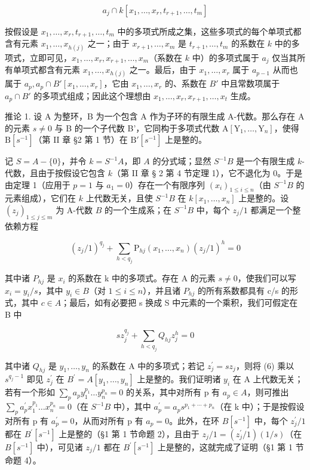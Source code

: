 \[
a _ {j} \cap k [ x _ {1}, \dots , x _ {r}, t _ {r + 1}, \dots , t _ {m} ]
\]

按假设是 \(x_1, \ldots, x_r, t_{r+1}, \ldots, t_m\) 中的多项式所成之集，这些多项式的每个单项式都含有元素 \(x_1, \ldots, x_{h(j)}\) 之一；由于 \(x_{r+1}, \ldots, x_m\) 是 \(t_{r+1}, \ldots, t_m\) 的系数在 \(k\) 中的多项式，立即可见，\(x_1, \ldots, x_r, x_{r+1}, \ldots, x_m\)（系数在 \(k\) 中）的多项式属于 \(a_j\) 仅当其所有单项式都含有元素 \(x_1, \ldots, x_{h(j)}\) 之一。最后，由于 \(x_1, \ldots, x_r\) 属于 \(a_{p-1}\) 从而也属于 \(a_p, a_p \cap B'[x_1, \ldots, x_r]\)，它由 \(x_1, \ldots, x_r\) 的、系数在 \(B'\) 中且常数项属于 \(a_p \cap B'\) 的多项式组成；因此这个理想由 \(x_1, \ldots, x_r, x_{r+1}, \ldots, x_t\) 生成。

推论 1. 设 A 为整环，B 为一个包含 A 作为子环的有限生成 A-代数。那么存在 A 的元素 \(s \neq 0\) 与 B 的一个子代数 B'，它同构于多项式代数 \(\mathrm{A}[\mathrm{Y}_{1}, \ldots, \mathrm{Y}_{n}]\)，使得 \(\mathrm{B}[s^{-1}]\)（第 II 章 §2 第 1 节）在 \(\mathrm{B}'[s^{-1}]\) 上是整的。

记 \(S = A - \{0\}\)，并令 \(k = S^{-1}A\)，即 \(A\) 的分式域；显然 \(S^{-1}B\) 是一个有限生成 \(k\)-代数，且由于按假设它包含 \(k\)（第 II 章 § 2 第 4 节定理 1），它不退化为 0。于是由定理 1（应用于 \(p = 1\) 与 \(a_1 = 0\)）存在一个有限序列 \((x_i)_{1 \leqslant i \leqslant n}\)（由 \(S^{-1}B\) 的元素组成），它们在 \(k\) 上代数无关，且使 \(S^{-1}B\) 在 \(k[x_1, \ldots, x_n]\) 上是整的。设 \((z_j)_{1 \leqslant j \leqslant m}\) 为 A-代数 \(B\) 的一个生成系；在 \(S^{-1}B\) 中，每个 \(z_j/1\) 都满足一个整依赖方程

\[
(z _ {j} / 1) ^ {q _ {j}} + \sum_ {h <   q _ {j}} \mathrm{P} _ {h j} (x _ {1}, \dots , x _ {n}) (z _ {j} / 1) ^ {h} = 0\tag{5}
\]

其中诸 \(P_{hj}\) 是 \(x_{i}\) 的系数在 k 中的多项式。存在 A 的元素 \(s \neq 0\)，使我们可以写 \(x_{i} = y_{i}/s\)，其中 \(y_{i} \in B\)（对 \(1 \leqslant i \leqslant n\)），并且诸 \(P_{hj}\) 的所有系数都具有 c/s 的形式，其中 \(c \in A\)；最后，如有必要把 s 换成 S 中元素的一个乘积，我们可假定在 B 中

\[
s z _ {j} ^ {q _ {j}} + \sum_ {h <   q _ {j}} Q _ {h j} z _ {j} ^ {h} = 0\tag{6}
\]

其中诸 \(Q_{hj}\) 是 \(y_{1},\ldots,y_{n}\) 的系数在 A 中的多项式；若记 \(z_{j}^{\prime}=sz_{j}\)，则将 (6) 乘以 \(s^{q_{j}-1}\) 即见 \(z_{j}^{\prime}\) 在 \(B^{\prime}=A[y_{1},\ldots,y_{n}]\) 上是整的。我们证明诸 \(y_{i}\) 在 A 上代数无关；若有一个形如 \(\sum_{p}a_{p}y_{1}^{p_{1}}\ldots y_{n}^{p_{n}}=0\) 的关系，其中对所有 p 有 \(a_{p}\in A\)，则可推出 \(\sum_{p}a_{p}^{\prime}x_{1}^{p_{1}}\ldots x_{n}^{p_{n}}=0\)（在 \(S^{-1}B\) 中），其中 \(a_{p}^{\prime}=a_{p}s^{p_{1}+\cdots+p_{n}}\)（在 k 中）；于是按假设对所有 p 有 \(a_{p}^{\prime}=0\)，从而对所有 p 有 \(a_{p}=0\)。此外，在环 \(B[s^{-1}]\) 中，每个 \(z_{j}^{\prime}/1\) 都在 \(B^{\prime}[s^{-1}]\) 上是整的（§1 第 1 节命题 2），且由于 \(z_{j}/1=(z_{j}^{\prime}/1)(1/s)\)（在 \(B[s^{-1}]\) 中），可见诸 \(z_{j}/1\) 都在 \(B^{\prime}[s^{-1}]\) 上是整的，这就完成了证明（§1 第 1 节命题 4）。

